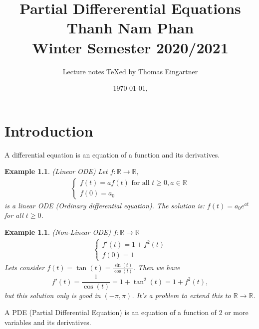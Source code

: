 \documentclass{report}
\title{Partial Differerential Equations \\ Thanh Nam Phan \\ Winter Semester 2020/2021}
\author{Lecture notes \TeX{}ed by Thomas Eingartner}
\date{\today, \currenttime}
\theoremstyle{tommy}
\newtheorem{eg}[defn]{Example}
\begin{document}
\maketitle
\tableofcontents
\newpage



\chapter{Introduction}

A differential equation is an equation of a function and its derivatives. 

\begin{eg} (Linear ODE)
  Let \(f: \mathbb{R} \to \mathbb{R}\),
  \begin{align*}
    \begin{cases}
      f(t) = a f(t) \text{ for all } t \ge 0, a \in \mathbb{R} \\
      f(0) = a_0
    \end{cases}
  \end{align*}
  is a linear ODE (Ordinary differential equation). The solution is: \(f(t) = a_0 e^{at}\) for all \(t \ge 0\).
\end{eg}

\begin{eg} (Non-Linear ODE) \(f: \mathbb{R} \to \mathbb{R}\)
  \begin{align*}
    \begin{cases}
      f'(t) = 1 + f^2(t) \\
      f(0) = 1
    \end{cases}
  \end{align*}
  Lets consider \(f(t) = \tan(t) = \frac{\sin(t)}{\cos(t)}\). Then we have \[f'(t) = \frac{1}{\cos(t)} = 1 + \tan^2(t) = 1 + f^2(t),\] but this solution only is \emph{good} in \((- \pi, \pi)\). It's a problem to extend this to \(\mathbb{R} \to \mathbb{R}\).
\end{eg}

A PDE (Partial Differential Equation) is an equation of a function of 2 or more variables and its derivatives.
\end{document}
